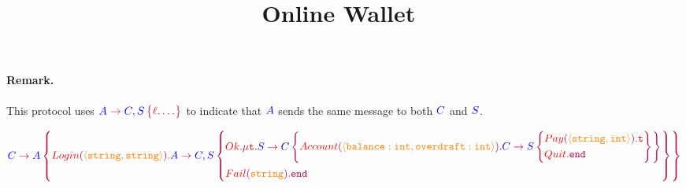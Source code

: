 \documentclass{article}
\title{Online Wallet~\cite{NeykovaSPY2013}}
\date{}
\newcommand{\tuple}[1]{\langle #1\rangle}
\begin{document}
	\maketitle

\paragraph{Remark.}
This protocol uses $\gtComm{A}{C, S}{{{\ell}{\dots}}}$ to indicate that
${\color{blue} A}$ sends the same message to both ${\color{blue} C}$ and
${\color{blue} S}$.

	$$
	\gtComm{C}{A}{
		{{Login}[\tuple{string, string}]{
				\gtComm{A}{C, S}{
					{{Ok}{\gtRec{t}{
								\gtComm{S}{C}{
								{{Account}[\tuple{balance:int, overdraft:int}]{
										\gtComm{C}{S}{
											{{Pay}[\tuple{string,int}]{\gtVar{t}}}
											{{Quit}{\gtEnd}}
										}
									}}
								}
					}}}
					{{Fail}[string]{\gtEnd}}
				}
		}}
	}
	$$

	
	
\end{document}

